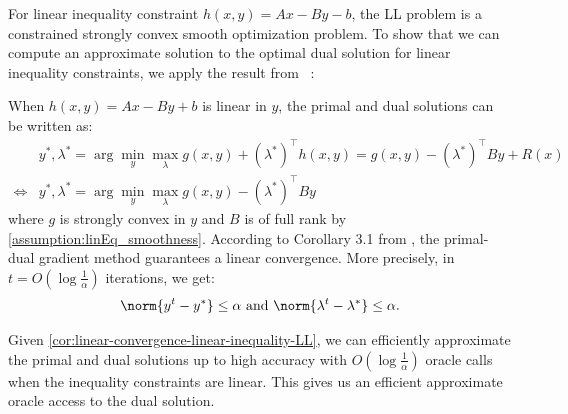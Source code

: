 For linear inequality constraint $h(x,y) = Ax - By - b$, the LL problem is a constrained strongly convex smooth optimization problem. 
To show that we can compute an approximate solution to the optimal dual solution for linear inequality constraints, we apply the result from ~\cite{du2019linear}:
\begin{corollary}\label{cor:linear-convergence-linear-inequality-LL}
    When $h(x,y) = Ax - By + b$ is linear in $y$, the primal and dual solutions can be written as:
    \begin{align}
        & y^*, \lambda^* = \arg\min_y \max_\lambda g(x,y) + (\lambda^*)^\top h(x,y) = g(x,y) - (\lambda^*)^\top B y + R(x) \nonumber \\
        \iff & y^*, \lambda^* = \arg\min_y \max_\lambda g(x,y) - (\lambda^*)^\top B y
    \end{align}
    where $g$ is strongly convex in $y$ and $B$ is of full rank by \cref{assumption:linEq_smoothness}. According to Corollary 3.1 from \cite{du2019linear}, the primal-dual gradient method guarantees a linear convergence. More precisely, in $t = O(\log \frac{1}{\alpha})$ iterations, we get:
    \begin{align}
        \norm{y^t - y^*} \leq \alpha \text{ and } \norm{\lambda^t - \lambda^*} \leq \alpha. 
    \end{align}
\end{corollary}
Given \cref{cor:linear-convergence-linear-inequality-LL}, we can efficiently approximate the primal and dual solutions up to high accuracy with $O(\log \frac{1}{\alpha})$ oracle calls when the inequality constraints are linear. This gives us an efficient approximate oracle access to the dual solution.

